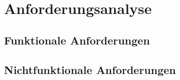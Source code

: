 \section{Anforderungsanalyse}
\subsection{Funktionale Anforderungen}
\subsection{Nichtfunktionale Anforderungen}